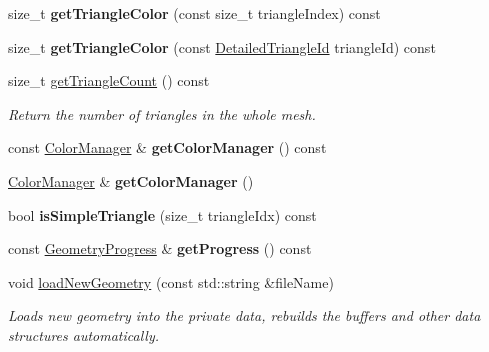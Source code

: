 \begin{DoxyCompactItemize}
size\+\_\+t {\bfseries get\+Triangle\+Color} (const size\+\_\+t triangle\+Index) const
\item 
\mbox{\label{classpepr3d_1_1_geometry_a83359891c1ed0cf815a5367c56c78d3e}} 
size\+\_\+t {\bfseries get\+Triangle\+Color} (const \mbox{\hyperlink{structpepr3d_1_1_detailed_triangle_id}{Detailed\+Triangle\+Id}} triangle\+Id) const
\item 
\mbox{\label{classpepr3d_1_1_geometry_acca576cfa8a735ecfe36e4fca67204d8}} 
size\+\_\+t \mbox{\hyperlink{classpepr3d_1_1_geometry_acca576cfa8a735ecfe36e4fca67204d8}{get\+Triangle\+Count}} () const
\begin{DoxyCompactList}\small\item\em Return the number of triangles in the whole mesh. \end{DoxyCompactList}\item 
\mbox{\label{classpepr3d_1_1_geometry_a08d96522ac82d058abd68bbda3ac1201}} 
const \mbox{\hyperlink{classpepr3d_1_1_color_manager}{Color\+Manager}} \& {\bfseries get\+Color\+Manager} () const
\item 
\mbox{\label{classpepr3d_1_1_geometry_a416e1fbfffdbeab4f5775fd0987d312d}} 
\mbox{\hyperlink{classpepr3d_1_1_color_manager}{Color\+Manager}} \& {\bfseries get\+Color\+Manager} ()
\item 
\mbox{\label{classpepr3d_1_1_geometry_a7b3af18af2bd43104f8024ca24c8541d}} 
bool {\bfseries is\+Simple\+Triangle} (size\+\_\+t triangle\+Idx) const
\item 
\mbox{\label{classpepr3d_1_1_geometry_ae0e251c83044d0cd06c50ded6cee21cb}} 
const \mbox{\hyperlink{structpepr3d_1_1_geometry_progress}{Geometry\+Progress}} \& {\bfseries get\+Progress} () const
\item 
void \mbox{\hyperlink{classpepr3d_1_1_geometry_a027715ec109b060ffc8b420947c4fde0}{load\+New\+Geometry}} (const std\+::string \&file\+Name)
\begin{DoxyCompactList}\small\item\em Loads new geometry into the private data, rebuilds the buffers and other data structures automatically. \end{DoxyCompactList}\item 

\end{DoxyCompactItemize}
